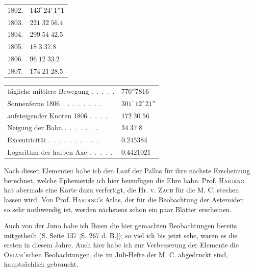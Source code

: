 \begin{center}\begingroup
\fontsize{9}{11}\selectfont
\setlength{\tabcolsep}{3pt}\renewcommand{\arraystretch}{1.12}
\begin{tabular}{ll}
1802.  & $143^\circ\,24'\,1''1$ \\
1803.  & $221\;32\;56.4$ \\
1804.  & $299\;54\;42.5$ \\
1805.  & $18\;3\;37.8$ \\
1806.  & $96\;12\;33.2$ \\
1807.  & $174\;21\;28.5$ \\
\end{tabular}\endgroup\end{center}
\begin{center}\begingroup
\fontsize{9}{11}\selectfont
\setlength{\tabcolsep}{3pt}\renewcommand{\arraystretch}{1.12}
\begin{tabular}{ll}
tägliche mittlere Bewegung .\ .\ .\ .\ . & $770''7816$ \\
Sonnenferne 1806 .\ .\ .\ .\ .\ .\ .\ . & $301^\circ\,12'\,21''$ \\
aufsteigender Knoten 1806 .\ .\ .\ . & $172\;30\;56$ \\
Neigung der Bahn .\ .\ .\ .\ .\ .\ . & $34\;37\;8$ \\
Excentricität .\ .\ .\ .\ .\ .\ .\ .\ .\ . & $0.245384$ \\
Logarithm der halben Axe .\ .\ .\ .\ . & $0.4421021$ \\
\end{tabular}\endgroup\end{center}
%
\par\indent Nach diesen Elementen habe ich den Lauf der Pallas für ihre nächste Erscheinung berechnet,
welche Ephemeride ich hier beizufügen die Ehre habe. Prof. \textsc{Harding} hat abermals eine Karte dazu
verfertigt, die Hr. \textsc{v. Zach} für die M. C. stechen lassen wird. Von Prof. \textsc{Harding}'s Atlas, der für die
Beobachtung der Asteroiden so sehr nothwendig ist, werden nächstens schon ein paar Blätter erscheinen.

\par\indent Auch von der Juno habe ich Ihnen die hier gemachten Beobachtungen bereits mitgetheilt (S.
Seite 137 [S. 267 d. B.]); so viel ich bis jetzt sehe, waren es die ersten in diesem Jahre. Auch hier habe
ich zur Verbesserung der Elemente die \textsc{Oriani}'schen Beobachtungen, die im Juli-Hefte der M. C. abgedruckt sind, hauptsächlich gebraucht.

